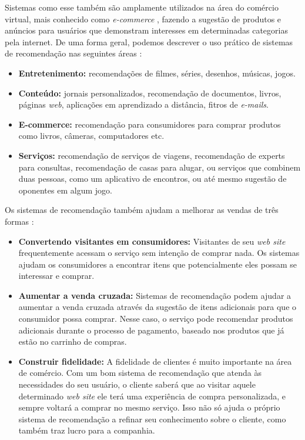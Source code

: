 \documentclass[
	12pt,				%
	oneside,			%
	a4paper,			%
	chapter=TITLE,		%
	english,			%
	french,				%
	spanish,			%
	brazil				%
	]{abntex2}
\begin{document}
Sistemas como esse também são amplamente utilizados na área do comércio virtual, mais conhecido como \emph{e-commerce} \cite{sarwar2002recommender}, fazendo a sugestão de produtos e anúncios para usuários que demonstram interesses em determinadas categorias pela internet. De uma forma geral, podemos descrever o uso prático de sistemas de recomendação nas seguintes áreas \cite{ricci2011introduction}:

\begin{itemize}
    \item \textbf{Entretenimento:} recomendações de filmes, séries, desenhos, músicas, jogos.
    \item \textbf{Conteúdo:} jornais personalizados, recomendação de documentos, livros, páginas \emph{web}, aplicações em aprendizado a distância, fitros de \emph{e-mails}.
    \item \textbf{E-commerce:} recomendação para consumidores para comprar produtos como livros, câmeras, computadores etc.
    \item \textbf{Serviços:} recomendação de serviços de viagens, recomendação de experts para consultas, recomendação de casas para alugar, ou serviços que combinem duas pessoas, como um aplicativo de encontros, ou até mesmo sugestão de oponentes em algum jogo.
\end{itemize}

Os sistemas de recomendação também ajudam a melhorar as vendas de três formas \cite{schafer2001commerce}:

\begin{itemize}
    \item \textbf{Convertendo visitantes em consumidores:} Visitantes de seu \emph{web site} frequentemente acessam o serviço sem intenção de comprar nada. Os sistemas ajudam os consumidores a encontrar itens que potencialmente eles possam se interessar e comprar.
    \item \textbf{Aumentar a venda cruzada:} Sistemas de recomendação podem ajudar a aumentar a venda cruzada através da sugestão de itens adicionais para que o consumidor possa comprar. Nesse caso, o serviço pode recomendar produtos adicionais durante o processo de pagamento, baseado nos produtos que já estão no carrinho de compras.
    \item \textbf{Construir fidelidade:} A fidelidade de clientes é muito importante na área de comércio. Com um bom sistema de recomendação que atenda às necessidades do seu usuário, o cliente saberá que ao visitar aquele determinado \emph{web site} ele terá uma experiência de compra personalizada, e sempre voltará a comprar no mesmo serviço. Isso não só ajuda o próprio sistema de recomendação a refinar seu conhecimento sobre o cliente, como também traz lucro para a companhia.
\end{itemize}
\end{document}
